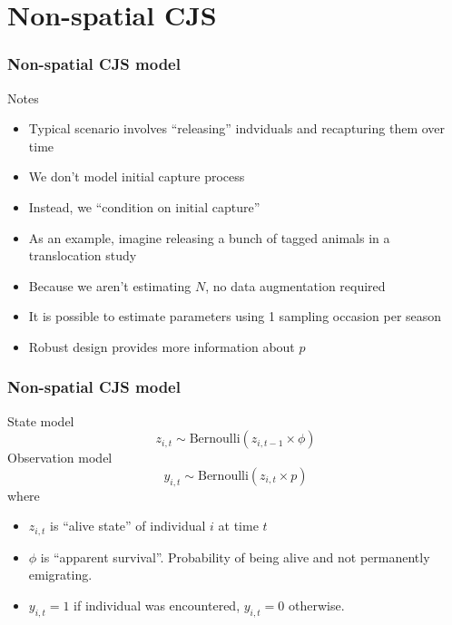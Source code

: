 \documentclass[color=usenames,dvipsnames]{beamer}\usepackage[]{graphicx}\usepackage[]{xcolor}
\begin{document}
\section{Non-spatial CJS}







\begin{frame}
  \frametitle{Non-spatial CJS model}
  \large
  Notes
  \begin{itemize}[<+->]
    \normalsize
    \item Typical scenario involves ``releasing'' indviduals and recapturing them over time
    \item We don't model initial capture process
    \item Instead, we ``condition on initial capture''
    \item As an example, imagine releasing a bunch of tagged animals
      in a translocation study
    \item Because we aren't estimating $N$, no data augmentation required
    \item It is possible to estimate parameters using 1 sampling occasion per season
    \item Robust design provides more information about $p$
  \end{itemize}
\end{frame}




\begin{frame}
  \frametitle{Non-spatial CJS model}
  State model
  \[
    z_{i,t} \sim \mbox{Bernoulli}(z_{i,t-1} \times \phi)
  \]
  \vfill
  Observation model
  \[
    y_{i,t} \sim \mbox{Bernoulli}(z_{i,t} \times p)
  \]
  \pause
  \vfill
  \small
  where
  \begin{itemize}
    \item $z_{i,t}$ is ``alive state'' of individual $i$ at time $t$
    \item $\phi$ is ``apparent survival''. Probability of being alive
      and not permanently emigrating. 
    \item $y_{i,t}=1$ if individual was encountered, $y_{i,t}=0$ otherwise.
  \end{itemize}
\end{frame}
\end{document}
